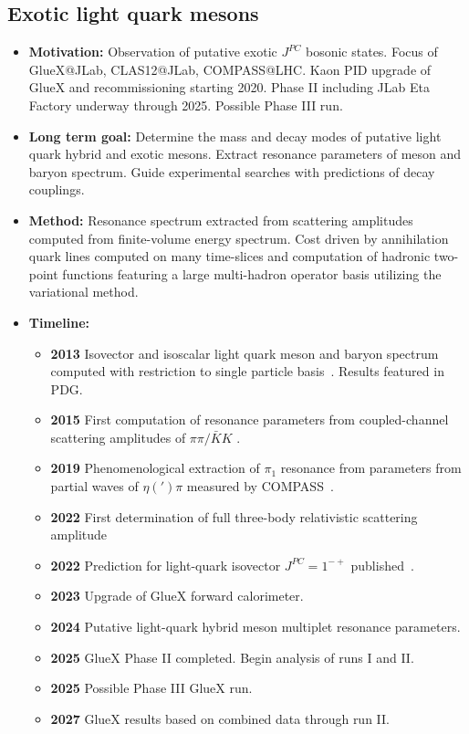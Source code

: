 \documentclass[12pt,hyperpdf]{article}
\begin{document}
\subsection{Exotic light quark mesons}
\begin{itemize}
    \item{\bf Motivation:} Observation of putative exotic $J^{PC}$ bosonic
      states. Focus of GlueX@JLab, CLAS12@JLab, COMPASS@LHC. Kaon PID
      upgrade of GlueX and recommissioning starting 2020. Phase II
      including JLab Eta Factory underway through 2025. Possible Phase
      III run.  
    \item{\bf Long term goal:} Determine the mass and decay modes of
      putative light quark hybrid and exotic mesons. Extract resonance
      parameters of meson and baryon spectrum. Guide experimental
      searches with predictions of decay couplings.
    \item{\bf Method:} Resonance spectrum extracted from scattering
      amplitudes computed from finite-volume energy spectrum. Cost
      driven by annihilation quark lines computed on many
      time-slices and computation of hadronic two-point functions
      featuring a large multi-hadron operator basis utilizing the variational method. 
\item{\bf Timeline:}
\begin{itemize}
    \item{\bf 2013} Isovector and isoscalar light quark meson and baryon
      spectrum computed with restriction to single particle basis~\cite{Dudek:2013yja}. Results featured in PDG.
    \item{\bf 2015} First computation of resonance parameters from coupled-channel scattering
      amplitudes of $\pi\pi/\bar{K}K$ \cite{Wilson:2015dqa}.
    \item{\bf 2019} Phenomenological extraction of $\pi_1$ resonance from 
      parameters from partial waves of $\eta(')\pi$ measured by COMPASS~\cite{JPAC:2018zyd}.
    \item{\bf 2022} First determination of full three-body relativistic scattering amplitude~\cite{Hansen:2020otl}
    \item{\bf 2022} Prediction for light-quark isovector $J^{PC}=1^{-+}$ published~\cite{Woss:2020ayi}.
    \item{\bf 2023} Upgrade of GlueX forward calorimeter.
    \item{\bf 2024} Putative light-quark hybrid meson multiplet resonance parameters.
    \item{\bf 2025} GlueX Phase II completed. Begin analysis of runs I and II. 
    \item{\bf 2025} Possible Phase III GlueX run.
    \item{\bf 2027} GlueX results based on combined data through run II.
\end{itemize}
\end{itemize}
\end{document}
